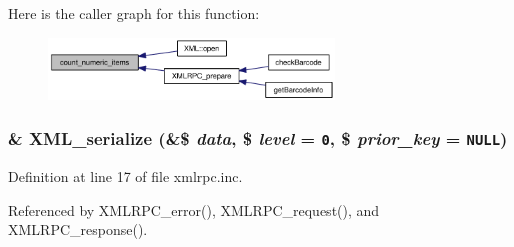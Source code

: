 Here is the caller graph for this function:\nopagebreak
\begin{figure}[H]
\begin{center}
\leavevmode
\includegraphics[width=215pt]{xmlrpc_8inc_88839ba2c5c835c99f55578c65faa401_icgraph}
\end{center}
\end{figure}
\hypertarget{xmlrpc_8inc_a1e9b05a06f28fabb86c10129f5890ef}{
\subsubsection{\setlength{\rightskip}{0pt plus 5cm}\& XML\_\-serialize (\&\$ {\em data}, \$ {\em level} = {\tt 0}, \$ {\em prior\_\-key} = {\tt NULL})}}
\label{xmlrpc_8inc_a1e9b05a06f28fabb86c10129f5890ef}




Definition at line 17 of file xmlrpc.inc.

Referenced by XMLRPC\_\-error(), XMLRPC\_\-request(), and XMLRPC\_\-response().

